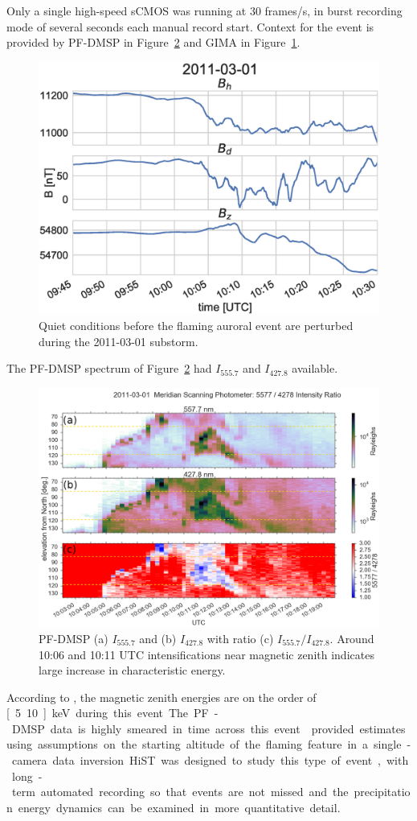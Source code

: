 Only a single high-speed sCMOS was running at 30 frames/s, in burst recording mode of several seconds each manual record start.
Context for the event is provided by PF-DMSP in Figure~\ref{fig:msp20110301} and GIMA in Figure~\ref{fig:mag20110301}.
\begin{figure}\centering
    \includegraphics[width=\columnwidth]{gfx/2011-03-01/mag}
    \caption{Quiet conditions before the flaming auroral event are perturbed during the 2011-03-01 substorm.}
    \label{fig:mag20110301}
\end{figure}
The PF-DMSP spectrum of Figure~\ref{fig:msp20110301} had $I_{555.7}$ and $I_{427.8}$ available.
\begin{figure}\centering
    \includegraphics[width=\columnwidth]{gfx/2011-03-01/msp_ratio}
    \caption{PF-DMSP (a) $I_{555.7}$ and (b) $I_{427.8}$ with ratio (c) $I_{555.7} / I_{427.8}$. Around 10:06 and 10:11 UTC  intensifications near magnetic zenith indicates large increase in characteristic energy.}
    \label{fig:msp20110301}
\end{figure}
According to \citet{rees1974}, the magnetic zenith energies are on the order of \unit[5..10]{keV} during this event.
The PF-DMSP data is highly smeared in time across this event.
\citet{dahlgren2013} provided estimates using assumptions on the starting altitude of the flaming feature in a single-camera data inversion.
HiST was designed to study this type of event, with long-term automated recording so that events are not missed and the precipitation energy dynamics can be examined in more quantitative detail.